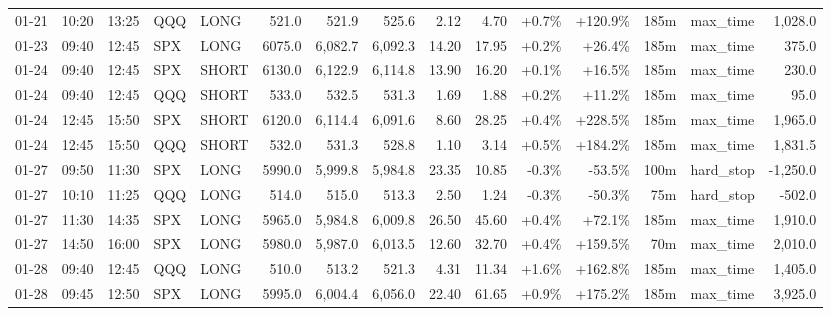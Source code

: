 \documentclass[11pt,a4paper,twoside]{article}
\begin{document}
\begin{landscape}
\begin{center}
\begin{longtable}{>{\color{txtmain}}l l l l l r r r r r r r r >{\color{txtmain}}l r}
01-21 & 10:20 & 13:25 & QQQ & LONG & 521.0 & 521.9 & 525.6 & 2.12 & 4.70 & \textcolor{wingreen}{+0.7\%} & \textcolor{wingreen}{+120.9\%} & 185m & max\_time & \textcolor{wingreen}{1,028.0} \\
01-23 & 09:40 & 12:45 & SPX & LONG & 6075.0 & 6,082.7 & 6,092.3 & 14.20 & 17.95 & \textcolor{wingreen}{+0.2\%} & \textcolor{wingreen}{+26.4\%} & 185m & max\_time & \textcolor{wingreen}{375.0} \\
01-24 & 09:40 & 12:45 & SPX & SHORT & 6130.0 & 6,122.9 & 6,114.8 & 13.90 & 16.20 & \textcolor{wingreen}{+0.1\%} & \textcolor{wingreen}{+16.5\%} & 185m & max\_time & \textcolor{wingreen}{230.0} \\
01-24 & 09:40 & 12:45 & QQQ & SHORT & 533.0 & 532.5 & 531.3 & 1.69 & 1.88 & \textcolor{wingreen}{+0.2\%} & \textcolor{wingreen}{+11.2\%} & 185m & max\_time & \textcolor{wingreen}{95.0} \\
01-24 & 12:45 & 15:50 & SPX & SHORT & 6120.0 & 6,114.4 & 6,091.6 & 8.60 & 28.25 & \textcolor{wingreen}{+0.4\%} & \textcolor{wingreen}{+228.5\%} & 185m & max\_time & \textcolor{wingreen}{1,965.0} \\
01-24 & 12:45 & 15:50 & QQQ & SHORT & 532.0 & 531.3 & 528.8 & 1.10 & 3.14 & \textcolor{wingreen}{+0.5\%} & \textcolor{wingreen}{+184.2\%} & 185m & max\_time & \textcolor{wingreen}{1,831.5} \\
01-27 & 09:50 & 11:30 & SPX & LONG & 5990.0 & 5,999.8 & 5,984.8 & 23.35 & 10.85 & \textcolor{lossred}{-0.3\%} & \textcolor{lossred}{-53.5\%} & 100m & hard\_stop & \textcolor{lossred}{-1,250.0} \\
01-27 & 10:10 & 11:25 & QQQ & LONG & 514.0 & 515.0 & 513.3 & 2.50 & 1.24 & \textcolor{lossred}{-0.3\%} & \textcolor{lossred}{-50.3\%} & 75m & hard\_stop & \textcolor{lossred}{-502.0} \\
01-27 & 11:30 & 14:35 & SPX & LONG & 5965.0 & 5,984.8 & 6,009.8 & 26.50 & 45.60 & \textcolor{wingreen}{+0.4\%} & \textcolor{wingreen}{+72.1\%} & 185m & max\_time & \textcolor{wingreen}{1,910.0} \\
01-27 & 14:50 & 16:00 & SPX & LONG & 5980.0 & 5,987.0 & 6,013.5 & 12.60 & 32.70 & \textcolor{wingreen}{+0.4\%} & \textcolor{wingreen}{+159.5\%} & 70m & max\_time & \textcolor{wingreen}{2,010.0} \\
01-28 & 09:40 & 12:45 & QQQ & LONG & 510.0 & 513.2 & 521.3 & 4.31 & 11.34 & \textcolor{wingreen}{+1.6\%} & \textcolor{wingreen}{+162.8\%} & 185m & max\_time & \textcolor{wingreen}{1,405.0} \\
01-28 & 09:45 & 12:50 & SPX & LONG & 5995.0 & 6,004.4 & 6,056.0 & 22.40 & 61.65 & \textcolor{wingreen}{+0.9\%} & \textcolor{wingreen}{+175.2\%} & 185m & max\_time & \textcolor{wingreen}{3,925.0} \\

\end{longtable}
\end{center}
\end{landscape}
\end{document}
